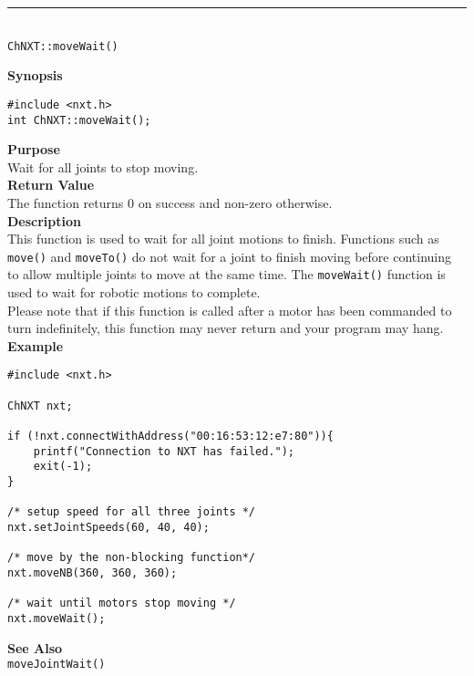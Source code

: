 \noindent
\vspace{5pt}
\rule{4.5in}{0.015in}\\
\noindent
{\LARGE \texttt{ChNXT::moveWait()}}\\
{}

\noindent
{\bf Synopsis}
\vspace{-8pt}
\begin{verbatim}
#include <nxt.h>
int ChNXT::moveWait();
\end{verbatim}

\noindent
{\bf Purpose}\\
Wait for all joints to stop moving.\\

\noindent
{\bf Return Value}\\
The function returns 0 on success and non-zero otherwise.\\

\noindent
{\bf Description}\\
This function is used to wait for all joint motions to finish. Functions such as
\texttt{move()} and \texttt{moveTo()} do not wait for a joint to finish
moving before continuing to allow multiple joints to move at the same time. The
\texttt{moveWait()} function is used to wait for robotic motions to complete.\\

\noindent
Please note that if this function is called after a motor has been commanded to
turn indefinitely, this function may never return and your program may hang.\\

\noindent
{\bf Example}
\begin{verbatim}
#include <nxt.h> 

ChNXT nxt;

if (!nxt.connectWithAddress("00:16:53:12:e7:80")){
    printf("Connection to NXT has failed.");
    exit(-1);
}
 
/* setup speed for all three joints */
nxt.setJointSpeeds(60, 40, 40);

/* move by the non-blocking function*/
nxt.moveNB(360, 360, 360);

/* wait until motors stop moving */
nxt.moveWait();
\end{verbatim}


\noindent
{\bf See Also}\\
\texttt{moveJointWait()}

